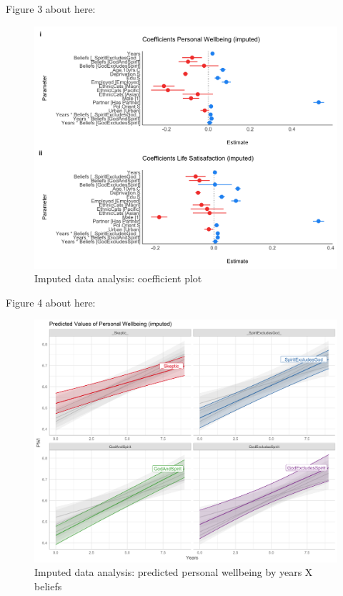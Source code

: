 \documentclass[
  english,
  man]{apa6}
\begin{document}
Figure 3 about here:

\begin{figure}
\includegraphics[width=6.4in]{Figs/coefficient_plot_both_imputed-1} \caption{Imputed data analysis: coefficient plot}\label{fig:unnamed-chunk-4}
\end{figure}

Figure 4 about here:

\begin{figure}
\includegraphics[width=6.4in]{Figs/predicted_PWI_impute-1} \caption{Imputed data analysis: predicted personal wellbeing by years X beliefs}\label{fig:unnamed-chunk-5}
\end{figure}
\end{document}

